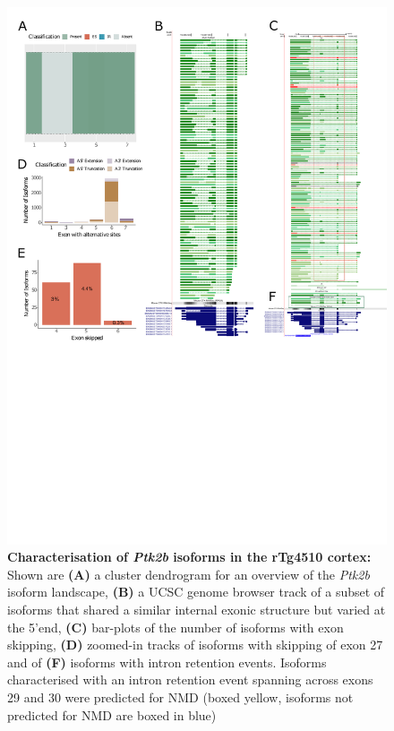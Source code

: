 \begin{figure}[htp]
	\centering
	\includegraphics[page=6,trim={0 2cm 0 0},scale = 0.85]{Figures/TargetGenes_Annotation_Portrait.pdf}
	\captionsetup{width=0.95\textwidth}
	\caption[Characterisation of \textit{Ptk2b} isoforms in the rTg4510 cortex]%
	{\textbf{Characterisation of \textit{Ptk2b} isoforms in the rTg4510 cortex:} Shown are \textbf{(A)} a cluster dendrogram for an overview of the \textit{Ptk2b} isoform landscape, \textbf{(B)} a UCSC genome browser track of a subset of isoforms that shared a similar internal exonic structure but varied at the 5'end, \textbf{(C)} bar-plots of the number of isoforms with exon skipping, \textbf{(D)} zoomed-in tracks of isoforms with skipping of exon 27 and of \textbf{(F)} isoforms with intron retention events. Isoforms characterised with an intron retention event spanning across exons 29 and 30 were predicted for NMD (boxed yellow, isoforms not predicted for NMD are boxed in blue)}    
	\label{fig:ptk2b}
\end{figure}
\restoregeometry

